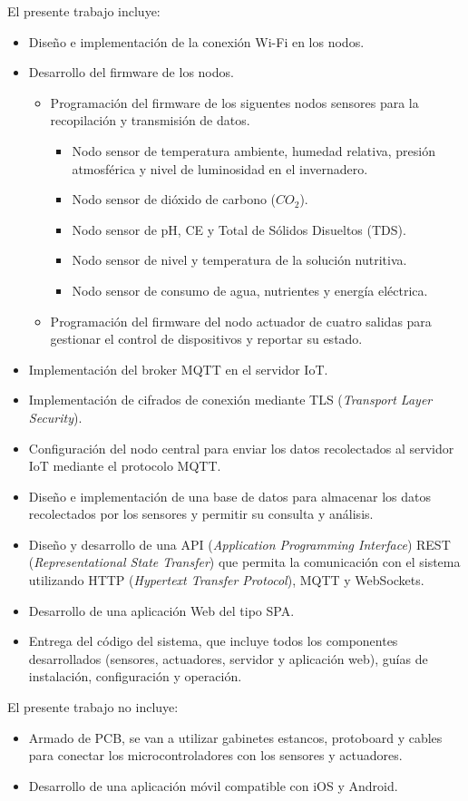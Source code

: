 El presente trabajo incluye:
\begin{itemize}
	\item Diseño e implementación de la conexión Wi-Fi en los nodos.
	\item Desarrollo del firmware de los nodos.
	      \begin{itemize}
		      \item Programación del firmware de los siguentes nodos sensores para la recopilación
		            y transmisión de datos.
		            \begin{itemize}
			            \item Nodo sensor de temperatura ambiente, humedad relativa, presión atmosférica y nivel de luminosidad en el invernadero.
			            \item Nodo sensor de dióxido de carbono ($CO_2$).
			            \item Nodo sensor de pH, CE y Total de Sólidos Disueltos (TDS).
			            \item Nodo sensor de nivel y temperatura de la solución nutritiva.
			            \item Nodo sensor de consumo de agua, nutrientes y energía eléctrica.
		            \end{itemize}
		      \item Programación del firmware del nodo actuador de cuatro salidas para gestionar el
		            control de dispositivos y reportar su estado.
	      \end{itemize}
	\item Implementación del broker MQTT en el servidor IoT.
	\item Implementación de cifrados de conexión mediante TLS (\textit{Transport Layer Security}).
	\item Configuración del nodo central para enviar los datos recolectados al servidor IoT mediante el protocolo MQTT.
	\item Diseño e implementación de una base de datos para almacenar los datos recolectados por los sensores y permitir su consulta y análisis.
	\item Diseño y desarrollo de una API (\textit{Application Programming Interface}) REST (\textit{Representational State Transfer}) que permita 
		  la comunicación con el sistema utilizando HTTP (\textit{Hypertext Transfer Protocol}), MQTT y WebSockets.
	\item Desarrollo de una aplicación Web del tipo SPA.
	\item Entrega del código del sistema, que incluye todos los componentes desarrollados (sensores, actuadores, servidor y aplicación web), guías de instalación,
	      configuración y operación.
\end{itemize}

El presente trabajo no incluye:
\begin{itemize}
	\item Armado de PCB, se van a utilizar gabinetes estancos, protoboard y cables para conectar los microcontroladores con los sensores y actuadores.
	\item Desarrollo de una aplicación móvil compatible con iOS y Android.
\end{itemize}